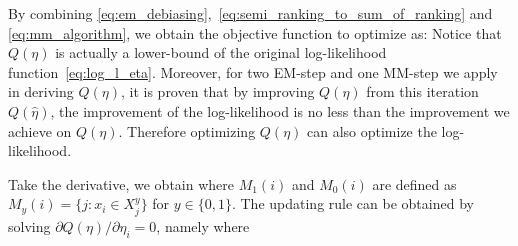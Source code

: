 By combining \eqref{eq:em_debiasing},~\eqref{eq:semi_ranking_to_sum_of_ranking} and \eqref{eq:mm_algorithm},
we obtain the objective function to optimize as:
%
Notice that $Q(\eta)$ is actually a lower-bound of the original log-likelihood function~\eqref{eq:log_l_eta}.
Moreover, for two EM-step and one MM-step we apply in deriving $Q(\eta)$,
it is proven that by improving $Q(\eta)$ from this iteration $Q(\hat{\eta})$, 
the improvement of the log-likelihood is no less than the improvement we achieve on $Q(\eta)$.  
Therefore optimizing $Q(\eta)$ can also optimize the log-likelihood.



Take the derivative, we obtain
%
where $M_1(i)$ and $M_0(i)$ are defined as $M_y(i) = \{j:x_i \in X_j^y\}$ for $y \in \{0, 1\}$.
The updating rule can be obtained by solving $\partial Q(\eta) / \partial \eta_i = 0$, namely
where

